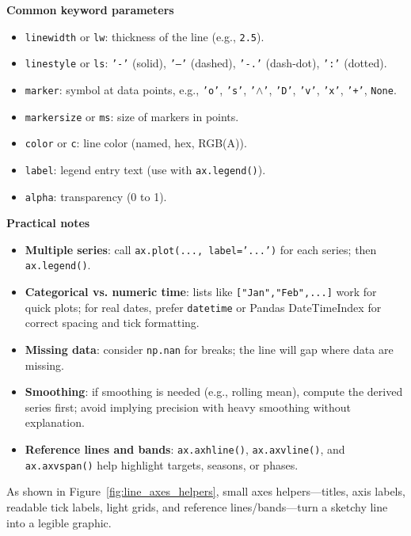 \textbf{Common keyword parameters}
\begin{itemize}
    \item \texttt{linewidth} or \texttt{lw}: thickness of the line (e.g., \texttt{2.5}).
    \item \texttt{linestyle} or \texttt{ls}: \texttt{'-'} (solid), \texttt{'--'} (dashed), \texttt{'-.'} (dash-dot), \texttt{':'} (dotted).
    \item \texttt{marker}: symbol at data points, e.g., \texttt{'o'}, \texttt{'s'}, \texttt{'$\wedge$'}, \texttt{'D'}, \texttt{'v'}, \texttt{'x'}, \texttt{'+'}, \texttt{None}.
    \item \texttt{markersize} or \texttt{ms}: size of markers in points.
    \item \texttt{color} or \texttt{c}: line color (named, hex, RGB(A)).
    \item \texttt{label}: legend entry text (use with \texttt{ax.legend()}).
    \item \texttt{alpha}: transparency (0 to 1).
\end{itemize}

\textbf{Practical notes}
\begin{itemize}
    \item \textbf{Multiple series}: call \texttt{ax.plot(..., label='...')} for each series; then \texttt{ax.legend()}.
    \item \textbf{Categorical vs. numeric time}: lists like \texttt{["Jan","Feb",...]} work for quick plots; for real dates, prefer \texttt{datetime} or Pandas DateTimeIndex for correct spacing and tick formatting.
    \item \textbf{Missing data}: consider \texttt{np.nan} for breaks; the line will gap where data are missing.
    \item \textbf{Smoothing}: if smoothing is needed (e.g., rolling mean), compute the derived series first; avoid implying precision with heavy smoothing without explanation.
    \item \textbf{Reference lines and bands}: \texttt{ax.axhline()}, \texttt{ax.axvline()}, and \texttt{ax.axvspan()} help highlight targets, seasons, or phases.
\end{itemize}


As shown in Figure~\ref{fig:line_axes_helpers}, small axes helpers—titles, axis labels, readable tick labels, light grids, and reference lines/bands—turn a sketchy line into a legible graphic.

